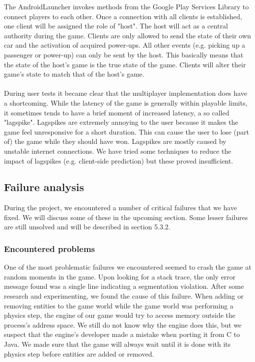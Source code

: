 {The AndroidLauncher invokes methods from the Google Play Services Library to connect players to each other. Once a connection with all clients is established, one client will be assigned the role of "host". The host will act as a central authority during the game. Clients are only allowed to send the state of their own car and the activation of acquired power-ups. All other events (e.g. picking up a passenger or power-up) can only be sent by the host. This basically means that the state of the host's game is the true state of the game. Clients will alter their game's state to match that of the host's game. \\
\\
During user tests it became clear that the multiplayer implementation does have a shortcoming. While the latency of the game is generally within playable limits, it sometimes tends to have a brief moment of increased latency, a so called "lagspike". Lagspikes are extremely annoying to the user because it makes the game feel unresponsive for a short duration. This can cause the user to lose (part of) the game while they should have won. Lagspikes are mostly caused by unstable internet connections. We have tried some techniques to reduce the impact of lagspikes (e.g. client-side prediction) but these proved insufficient.

\subsection{Failure analysis}

During the project, we encountered a number of critical failures that we have fixed. We will discuss some of these in the upcoming section. Some lesser failures are still unsolved and will be described in section 5.3.2. \\

\subsubsection{Encountered problems}


One of the most problematic failures we encountered seemed to crash the game at random moments in the game. Upon looking for a stack trace, the only error message found was a single line indicating a segmentation violation. After some research and experimenting, we found the cause of this failure. When adding or removing entities to the game world while the game world was performing a physics step, the engine of our game would try to access memory outside the process's address space. We still do not know why the engine does this, but we suspect that the engine's developer made a mistake when porting it from C to Java. We made sure that the game will always wait until it is done with its physics step before entities are added or removed. \\

}
